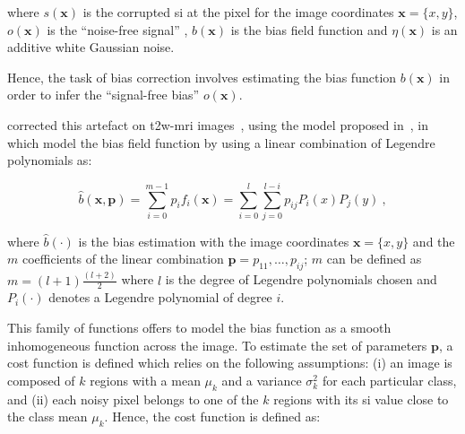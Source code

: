 \noindent where $s(\mathbf{x})$ is the corrupted \ac{si} at the pixel for the image coordinates $\mathbf{x} = \{x,y\}$, $o(\mathbf{x})$ is the ``noise-free signal'' , $b(\mathbf{x})$ is the bias field function and $\eta(\mathbf{x})$ is an additive white Gaussian noise.
%
%
%

Hence, the task of bias correction involves estimating the bias function $b(\mathbf{x})$ in order to infer the ``signal-free bias'' $o(\mathbf{x})$.


\citeauthor{Viswanath2009} corrected this artefact on \ac{t2w}-\ac{mri} images~\cite{Viswanath2009}, using the model proposed in~\cite{Styner2000}, in which \citeauthor{Styner2000} model the bias field function by using a linear combination of Legendre polynomials as:

\begin{equation}
	\hat{b}(\mathbf{x},\mathbf{p}) = \sum_{i=0}^{m-1} p_i f_i(\mathbf{x}) =  \sum_{i=0}^{l} \sum_{j=0}^{l-i} p_{ij} P_i(x) P_j(y) \ ,
	\label{eq:biascorr}
\end{equation}

\noindent where $\hat{b}(\cdot)$ is the bias estimation with the image coordinates $\mathbf{x} = \{x,y\}$ and the $m$ coefficients of the linear combination $\mathbf{p} = {p_{11},\dotsc,p_{ij}}$; $m$ can be defined as $m=(l+1)\frac{(l+2)}{2}$ where $l$ is the degree of Legendre polynomials chosen and $P_i(\cdot)$ denotes a Legendre polynomial of degree $i$.

This family of functions offers to model the bias function as a smooth inhomogeneous function across the image.
To estimate the set of parameters $\mathbf{p}$, a cost function is defined which relies on the following assumptions: (i) an image is composed of $k$ regions with a mean $\mu_k$ and a variance $\sigma^{2}_{k}$ for each particular class, and (ii) each noisy pixel belongs to one of the $k$ regions with its \ac{si} value close to the class mean $\mu_k$.
Hence, the cost function is defined as:

